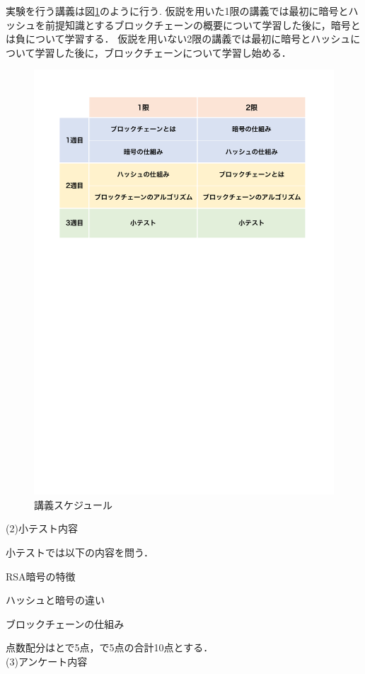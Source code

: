 \documentclass[a4j,12pt]{jsarticle}
\begin{document}
実験を行う講義は図\ref{fig:timeline}のように行う.
仮説を用いた1限の講義では最初に暗号とハッシュを前提知識とするブロックチェーンの概要について学習した後に，暗号とは負について学習する．
仮説を用いない2限の講義では最初に暗号とハッシュについて学習した後に，ブロックチェーンについて学習し始める．
\begin{figure}[H]
\centering
\includegraphics[mediaboxonly=/CropBox,width=12cm]{timeline.pdf}
\caption{講義スケジュール}
\label{fig:timeline}
\end{figure} 


(2)小テスト内容

小テストでは以下の内容を問う．

RSA暗号の特徴

ハッシュと暗号の違い

ブロックチェーンの仕組み

点数配分はとで5点，で5点の合計10点とする．\\


(3)アンケート内容
\end{document}

